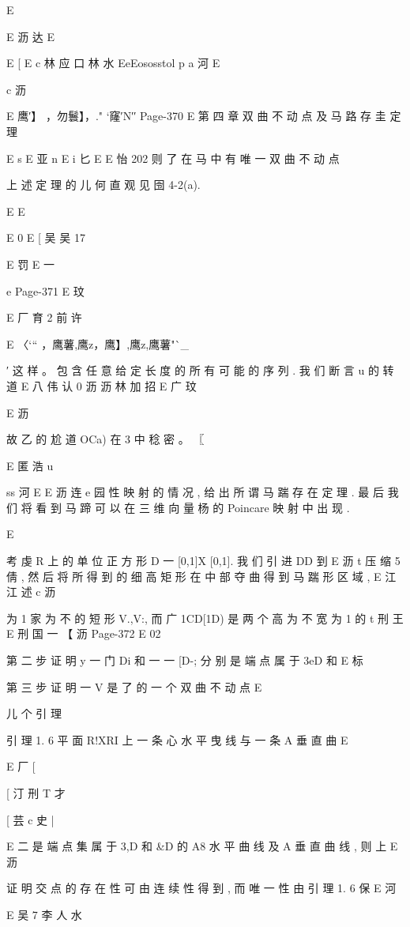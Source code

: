 {{{{{{{{{{{{{{{{E

E 沥 达
E

E [
E c 林 应 口 林 水
EeEososstol p a 河
E

c 沥

E {鹰′】 ，勿鬟】，." `窿′N′}′
Page-370
E 第 四 章 双 曲 不 动 点 及 马 路 存 圭 定 理

E s
E 亚 n
E i 匕
E
E 怡
202
则 了 在 马 中 有 唯 一 双 曲 不 动 点

上 述 定 理 的 儿 何 直 观 见 囹 4-2(a).

E
E

E 0
E [ 吴 吴 17

E 罚
E 一

e
Page-371
E 玟

E 厂 育 2 前 许

E 〈`“ ，鹰薯,鹰z，鹰】,鹰z,鹰薯"`_}′
这 样 。 包 含 任 意 给 定 长 度 的 所 有 可 能 的 序 列 . 我 们 断 言 u 的 转 道
E 八 伟 认 0 沥 沥 林 加 招
E 广
玟

E 沥

故 乙 的 尬 道 OCa) 在 3 中 稔 密 。 〖

E 匿 浩 u

ss 河
E
E 沥 连 e
园
性 映 射 的 情 况 , 给 出 所 谓 马 踹 存 在 定 理 . 最 后 我 们 将 看 到 马 蹄 可 以
在 三 维 向 量 杨 的 Poincare 映 射 中 出 现 .

E

考 虔 R 上 的 单 位 正 方 形 D 一 [0,1]X [0,1]. 我 们 引 进 DD 到
E 沥 t
压 缩 5 倩 , 然 后 将 所 得 到 的 细 高 矩 形 在 中 部 夺 曲 得 到 马 踹 形 区 域 ,
E 江江 述 c 沥

为 1 家 为 不 的 短 形 V.,V:, 而 广 1CD[1D) 是 两 个 高 为 不 宽 为 1 的
t 刑
王
E 刑 国 一
【 沥
Page-372
E 02

第 二 步 证 明 y 一 门 Di 和 一 一 [D-; 分 别 是 端 点 属 于 3eD 和
E 标

第 三 步 证 明 一 V 是 了 的 一 个 双 曲 不 动 点
E

儿 个 引 理

引 理 1. 6 平 面 R!XRI 上 一 条 心 水 平 曳 线 与 一 条 A 垂 直 曲
E

E
厂
[

[ 汀 刑 T
才

[ 芸 c 史 |

E 二
是 端 点 集 属 于 3,D 和 &D 的 A8 水 平 曲 线 及 A 垂 直 曲 线 , 则 上
E 沥

证 明 交 点 的 存 在 性 可 由 连 续 性 得 到 , 而 唯 一 性 由 引 理 1. 6 保
E 河

E 吴 7 李 人
水

}}}}}}}}}}}}}}}
